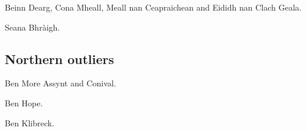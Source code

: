 \begin{munros}
\item
Beinn Dearg, Cona Mheall, Meall nan Ceapraichean and Eididh nan Clach Geala.

\item
Seana Bhràigh.
\end{munros}


\subsection{Northern outliers}

\begin{munros}
\item
Ben More Assynt and Conival.

\item
Ben Hope.

\item
Ben Klibreck.
\end{munros}
